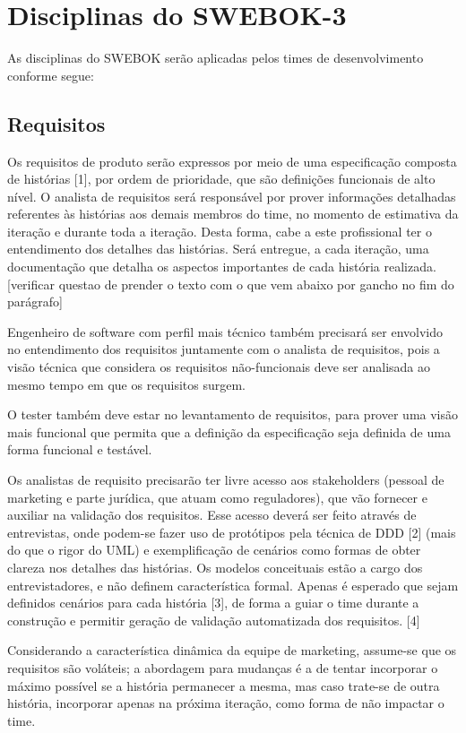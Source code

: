 \documentclass[12pt,journal,compsoc]{IEEEtran}
\begin{document}
\section{Disciplinas do SWEBOK-3}

As disciplinas do SWEBOK serão aplicadas pelos times de desenvolvimento conforme segue: 

\subsection{Requisitos}

Os requisitos de produto serão expressos por meio de uma especificação composta de histórias [1], por ordem de prioridade, que são definições funcionais de alto nível. O analista de requisitos será responsável por prover informações detalhadas referentes às histórias aos demais membros do time, no momento de estimativa da iteração e durante toda a iteração. Desta forma, cabe a este profissional ter o entendimento dos detalhes das histórias. Será entregue, a cada iteração, uma documentação que detalha os aspectos importantes de cada história realizada. [verificar questao de prender o texto com o que vem abaixo por gancho no fim do parágrafo]

Engenheiro de software com perfil mais técnico também precisará ser envolvido no entendimento dos requisitos juntamente com o analista de requisitos, pois a visão técnica que considera os requisitos não-funcionais deve ser analisada ao mesmo tempo em que os requisitos surgem.

O tester também deve estar no levantamento de requisitos, para prover uma visão mais funcional que permita que a definição da especificação seja definida de uma forma funcional e testável.

Os analistas de requisito precisarão ter livre acesso aos stakeholders (pessoal de marketing e parte jurídica, que atuam como reguladores), que vão fornecer e auxiliar na validação dos requisitos. Esse acesso deverá ser feito através de entrevistas, onde podem-se fazer uso de protótipos pela técnica de DDD [2] (mais do que o rigor do UML) e exemplificação de cenários como formas de obter clareza nos detalhes das histórias. Os modelos conceituais estão a cargo dos entrevistadores, e não definem característica formal. Apenas é esperado que sejam definidos cenários para cada história [3], de forma a guiar o time durante a construção e permitir geração de validação automatizada dos requisitos. [4]

Considerando a característica dinâmica da equipe de marketing, assume-se que os requisitos são voláteis; a abordagem para mudanças é a de tentar incorporar o máximo possível se a história permanecer a mesma, mas caso trate-se de outra história, incorporar apenas na próxima iteração, como forma de não impactar o time.
\end{document}
